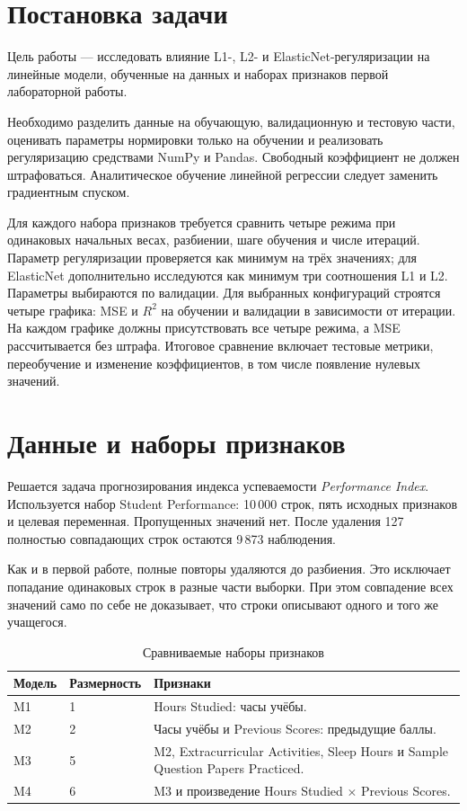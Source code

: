 \section{Постановка задачи}
Цель работы --- исследовать влияние L1-, L2- и ElasticNet-регуляризации на линейные модели, обученные на данных и наборах признаков первой лабораторной работы.

Необходимо разделить данные на обучающую, валидационную и тестовую части, оценивать параметры нормировки только на обучении и реализовать регуляризацию средствами NumPy и Pandas. Свободный коэффициент не должен штрафоваться. Аналитическое обучение линейной регрессии следует заменить градиентным спуском.

Для каждого набора признаков требуется сравнить четыре режима при одинаковых начальных весах, разбиении, шаге обучения и числе итераций. Параметр регуляризации проверяется как минимум на трёх значениях; для ElasticNet дополнительно исследуются как минимум три соотношения L1 и L2. Параметры выбираются по валидации. Для выбранных конфигураций строятся четыре графика: MSE и $R^2$ на обучении и валидации в зависимости от итерации. На каждом графике должны присутствовать все четыре режима, а MSE рассчитывается без штрафа. Итоговое сравнение включает тестовые метрики, переобучение и изменение коэффициентов, в том числе появление нулевых значений.

\section{Данные и наборы признаков}
Решается задача прогнозирования индекса успеваемости \textit{Performance Index}. Используется набор Student Performance: 10\,000 строк, пять исходных признаков и целевая переменная. Пропущенных значений нет. После удаления 127 полностью совпадающих строк остаются 9\,873 наблюдения.

Как и в первой работе, полные повторы удаляются до разбиения. Это исключает попадание одинаковых строк в разные части выборки. При этом совпадение всех значений само по себе не доказывает, что строки описывают одного и того же учащегося.

\begin{table}[H]\centering
\caption{Сравниваемые наборы признаков}
\begin{tabularx}{\textwidth}{llX}\toprule
Модель & Размерность & Признаки\\\midrule
M1 & 1 & Hours Studied: часы учёбы.\\
M2 & 2 & Часы учёбы и Previous Scores: предыдущие баллы.\\
M3 & 5 & M2, Extracurricular Activities, Sleep Hours и Sample Question Papers Practiced.\\
M4 & 6 & M3 и произведение Hours Studied $\times$ Previous Scores.\\\bottomrule
\end{tabularx}\end{table}

